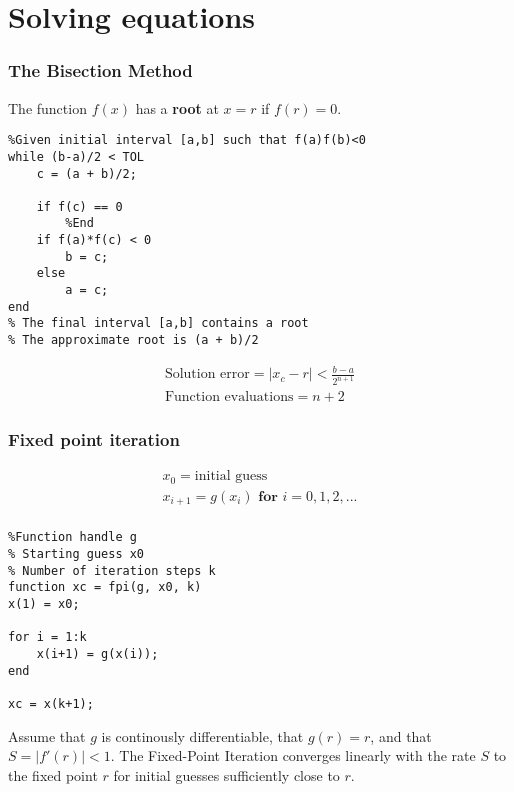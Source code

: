 \section{Solving equations}


\subsubsection{The Bisection Method}
\begin{definition}
The function $f(x)$ has a \textbf{root} at $x = r$ if $f(r) = 0$.
\end{definition}

\begin{lstlisting}
%Given initial interval [a,b] such that f(a)f(b)<0
while (b-a)/2 < TOL
    c = (a + b)/2;
    
    if f(c) == 0
        %End
    if f(a)*f(c) < 0
        b = c;
    else
        a = c;
end
% The final interval [a,b] contains a root
% The approximate root is (a + b)/2
\end{lstlisting}
\begin{gather*}
\text{Solution error} = |x_c - r| < \frac{b-a}{2^{n+1}} \\
\text{Function evaluations} = n + 2
\end{gather*}
\subsubsection{Fixed point iteration}
\begin{gather*}
x_0 = \text{initial guess} \\
x_{i+1} = g(x_i) \textbf{ for } i = 0,1,2,... \\
\end{gather*}

\begin{lstlisting}
%Function handle g
% Starting guess x0
% Number of iteration steps k
function xc = fpi(g, x0, k)
x(1) = x0;

for i = 1:k
    x(i+1) = g(x(i));
end

xc = x(k+1);
\end{lstlisting}

\begin{theorem*}
Assume that $g$ is continously differentiable, that $g(r) = r$, and that $S = |f'(r)| < 1$. The Fixed-Point Iteration converges linearly with the rate $S$ to the fixed point $r$ for initial guesses sufficiently close to $r$.
\end{theorem*}

